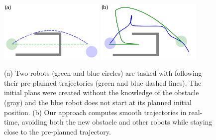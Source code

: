 \documentclass{svproc}
\begin{document}
\begin{figure}
\includegraphics[width=0.45\textwidth]{images/swap2_initial.pdf}
\hfill
\includegraphics[width=0.45\textwidth]{images/swap2_final.pdf}
\caption{(a) Two robots (green and blue circles) are tasked with following their pre-planned trajectories (green and blue dashed lines).
The initial plans were created without the knowledge of the obstacle (gray) and the blue robot does not start at its planned initial position.
(b) Our approach computes smooth trajectories in real-time, avoiding both the new obstacle and other robots while staying close to the pre-planned trajectory.
}
\label{fig:swap2}
\end{figure}
\end{document}
